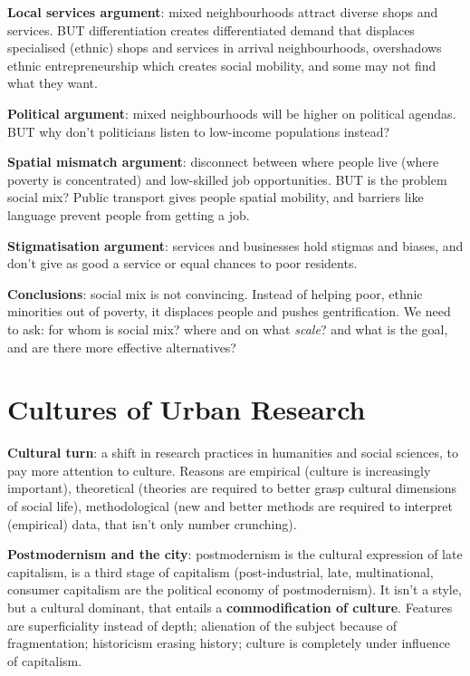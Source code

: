 \documentclass{article}
\newcommand{\alignedmarginpar}[1]{%
        \marginpar{\raggedright\small#1}}
\begin{document}
\textbf{Local services argument}: mixed neighbourhoods attract diverse shops and services. BUT differentiation creates differentiated demand that displaces specialised (ethnic) shops and services in arrival neighbourhoods, overshadows ethnic entrepreneurship which creates social mobility, and some may not find what they want.

\textbf{Political argument}:\alignedmarginpar{Environmental racism}mixed neighbourhoods will be higher on political agendas. BUT why don't politicians listen to low-income populations instead?

\textbf{Spatial mismatch argument}: disconnect between where people live (where poverty is concentrated) and low-skilled job opportunities. BUT is the problem social mix? Public transport gives people spatial mobility, and barriers like language prevent people from getting a job.

\textbf{Stigmatisation argument}: services and businesses hold stigmas and biases, and don't give as good a service or equal chances to poor residents.

\textbf{Conclusions}: social mix is not convincing. Instead of helping poor, ethnic minorities out of poverty, it displaces people and pushes gentrification. We need to ask: for whom is social mix? where and on what \textit{scale}? and what is the goal, and are there more effective alternatives? 

\pagebreak\section{Cultures of Urban Research}

\textbf{Cultural turn}: a shift in research practices in humanities and social sciences, to pay more attention to culture. Reasons are empirical (culture is increasingly important), theoretical (theories are required to better grasp cultural dimensions of social life), methodological (new and better methods are required to interpret (empirical) data, that isn't only number crunching).

\textbf{Postmodernism and the city}:\alignedmarginpar{Jameson,\\Bonaventura Hotel}postmodernism is the cultural expression of late capitalism, is a third stage of capitalism (post-industrial, late, multinational, consumer capitalism are the political economy of postmodernism). 
It isn't a style, but a cultural dominant, that entails a \textbf{commodification of culture}. Features are superficiality instead of depth; alienation of the subject because of fragmentation; historicism erasing history; culture is completely under influence of capitalism.
\end{document}
